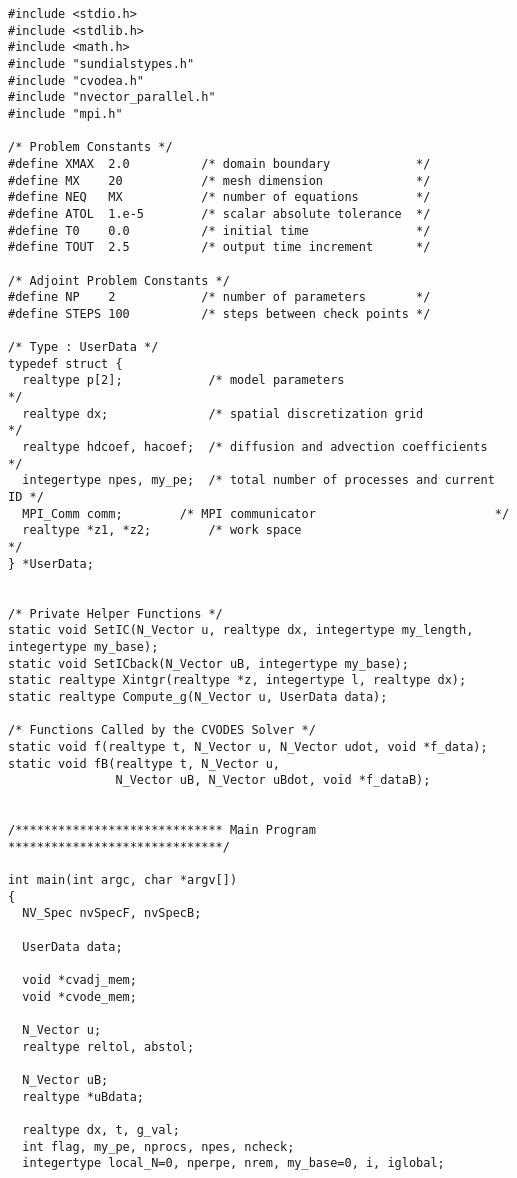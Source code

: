 \begin{verbatim}
#include <stdio.h>
#include <stdlib.h>
#include <math.h>
#include "sundialstypes.h"
#include "cvodea.h"
#include "nvector_parallel.h"
#include "mpi.h"

/* Problem Constants */
#define XMAX  2.0          /* domain boundary            */
#define MX    20           /* mesh dimension             */
#define NEQ   MX           /* number of equations        */
#define ATOL  1.e-5        /* scalar absolute tolerance  */
#define T0    0.0          /* initial time               */
#define TOUT  2.5          /* output time increment      */

/* Adjoint Problem Constants */
#define NP    2            /* number of parameters       */
#define STEPS 100          /* steps between check points */

/* Type : UserData */
typedef struct {
  realtype p[2];            /* model parameters                         */
  realtype dx;              /* spatial discretization grid              */
  realtype hdcoef, hacoef;  /* diffusion and advection coefficients     */
  integertype npes, my_pe;  /* total number of processes and current ID */
  MPI_Comm comm;        /* MPI communicator                         */
  realtype *z1, *z2;        /* work space                               */
} *UserData;


/* Private Helper Functions */
static void SetIC(N_Vector u, realtype dx, integertype my_length, integertype my_base);
static void SetICback(N_Vector uB, integertype my_base);
static realtype Xintgr(realtype *z, integertype l, realtype dx);
static realtype Compute_g(N_Vector u, UserData data);

/* Functions Called by the CVODES Solver */
static void f(realtype t, N_Vector u, N_Vector udot, void *f_data);
static void fB(realtype t, N_Vector u, 
               N_Vector uB, N_Vector uBdot, void *f_dataB);


/***************************** Main Program ******************************/

int main(int argc, char *argv[])
{
  NV_Spec nvSpecF, nvSpecB;

  UserData data;

  void *cvadj_mem;
  void *cvode_mem;
  
  N_Vector u;
  realtype reltol, abstol;

  N_Vector uB;
  realtype *uBdata;

  realtype dx, t, g_val;
  int flag, my_pe, nprocs, npes, ncheck;
  integertype local_N=0, nperpe, nrem, my_base=0, i, iglobal;


\end{verbatim}
